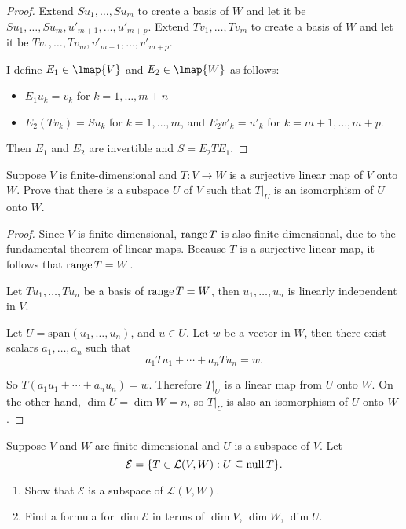 \begin{proof}
    Extend $Su_{1}, \ldots, Su_{m}$ to create a basis of $W$ and let it be $Su_{1}, \ldots, Su_{m}, u'_{m+1}, \ldots, u'_{m+p}$. Extend $Tv_{1}, \ldots, Tv_{m}$ to create a basis of $W$ and let it be $Tv_{1}, \ldots, Tv_{m}, v'_{m+1}, \ldots, v'_{m+p}$.

    I define $E_{1}\in\lmap{V}$ and $E_{2}\in\lmap{W}$ as follows:
    \begin{itemize}
        \item $E_{1}u_{k} = v_{k}$ for $k = 1, \ldots, m+n$
        \item $E_{2}(Tv_{k}) = Su_{k}$ for $k = 1,\ldots, m$, and $E_{2}v'_{k} = u'_{k}$ for $k = m+1, \ldots, m+p$.
    \end{itemize}

    Then $E_{1}$ and $E_{2}$ are invertible and $S = E_{2}TE_{1}$.
\end{proof}
\newpage

\begin{exercise}
    Suppose $V$ is finite-dimensional and $T: V \to W$ is a surjective linear map of $V$ onto $W$. Prove that there is a subspace $U$ of $V$ such that $T\vert_{U}$ is an isomorphism of $U$ onto $W$.
\end{exercise}

\begin{proof}
    Since $V$ is finite-dimensional, $\text{range}\,{T}$ is also finite-dimensional, due to the fundamental theorem of linear maps. Because $T$ is a surjective linear map, it follows that $\text{range}\,{T} = W$.

    Let $Tu_{1}, \ldots, Tu_{n}$ be a basis of $\text{range}\,{T} = W$, then $u_{1}, \ldots, u_{n}$ is linearly independent in $V$.

    Let $U = \text{span}(u_{1}, \ldots, u_{n})$, and $u\in U$. Let $w$ be a vector in $W$, then there exist scalars $a_{1}, \ldots, a_{n}$ such that
    \[
        a_{1}Tu_{1} + \cdots + a_{n}Tu_{n} = w.
    \]

    So $T(a_{1}u_{1} + \cdots + a_{n}u_{n}) = w$. Therefore $T\vert_{U}$ is a linear map from $U$ onto $W$. On the other hand, $\dim U = \dim W = n$, so $T\vert_{U}$ is also an isomorphism of $U$ onto $W$.
\end{proof}
\newpage

\begin{exercise}
    Suppose $V$ and $W$ are finite-dimensional and $U$ is a subspace of $V$. Let
    \[
        \mathcal{E} = \{ T\in\mathcal{L}(V, W): U\subseteq \text{null}\,{T} \}.
    \]

    \begin{enumerate}[label={(\alph*)}]
        \item Show that $\mathcal{E}$ is a subspace of $\mathcal{L}(V, W)$.
        \item Find a formula for $\dim\mathcal{E}$ in terms of $\dim V$, $\dim W$, $\dim U$.
    \end{enumerate}
\end{exercise}

